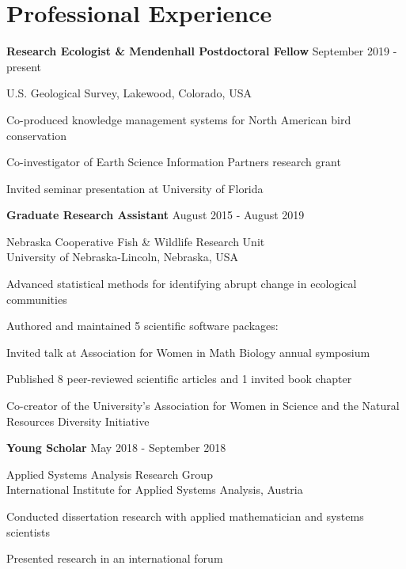 \documentclass[11pt,]{article}
\providecommand{\tightlist}{%
  \setlength{\itemsep}{0pt}\setlength{\parskip}{0pt}}
\renewenvironment{itemize}{
 \begin{list}{- }{
   \setlength{\leftmargin}{1.5em}
   \setlength{\itemsep}{0pt}
 }
}{
 \end{list}
}
\begin{document}
\hypertarget{professional-experience}{%
\section{Professional Experience}\label{professional-experience}}

\textbf{Research Ecologist \& Mendenhall Postdoctoral Fellow}
\hfill September 2019 - present

U.S. Geological Survey, Lakewood, Colorado, USA

\begin{itemize}
\tightlist
\item
  Co-produced knowledge management systems for North American bird
  conservation
\item
  Co-investigator of Earth Science Information Partners research grant
\item
  Invited seminar presentation at University of Florida
\end{itemize}

\textbf{Graduate Research Assistant} \hfill August 2015 - August 2019

Nebraska Cooperative Fish \& Wildlife Research Unit\\
University of Nebraska-Lincoln, Nebraska, USA

\begin{itemize}
\tightlist
\item
  Advanced statistical methods for identifying abrupt change in
  ecological communities
\item
  Authored and maintained 5 scientific software packages:
\item
  Invited talk at Association for Women in Math Biology annual symposium
\item
  Published 8 peer-reviewed scientific articles and 1 invited book
  chapter
\item
  Co-creator of the University's Association for Women in Science and
  the Natural Resources Diversity Initiative 
\end{itemize}

\textbf{Young Scholar} \hfill May 2018 - September 2018

Applied Systems Analysis Research Group\\
International Institute for Applied Systems Analysis, Austria

\begin{itemize}
\tightlist
\item
  Conducted dissertation research with applied mathematician and systems
  scientists
\item
  Presented research in an international forum 
\end{itemize}
\end{document}
